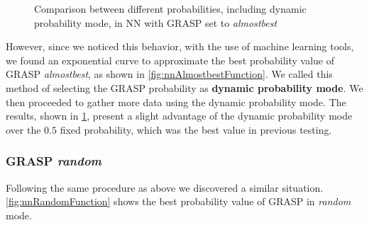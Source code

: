 \begin{figure}[htbp]
	\centering
	\caption{Comparison between different probabilities, including dynamic probability mode, in NN with GRASP set to \textit{almostbest}}
    \label{fig:nnAlmostbestCmp1}
\end{figure}

However, since we noticed this behavior, with the use of machine learning tools, we found an exponential curve to approximate the best probability value of GRASP \textit{almostbest}, as shown in \figurename{ \ref{fig:nnAlmostbestFunction}}.
We called this method of selecting the GRASP probability as \textbf{dynamic probability mode}.
We then proceeded to gather more data using the dynamic probability mode.
The results, shown in \figurename{ \ref{fig:nnAlmostbestCmp1}}, present a slight advantage of the dynamic probability mode over the $0.5$ fixed probability, which was the best value in previous testing.

\subsubsection{GRASP \textit{random}}

Following the same procedure as above we discovered a similar situation.
\figurename{ \ref{fig:nnRandomFunction}} shows the best probability value of GRASP in \textit{random} mode.

